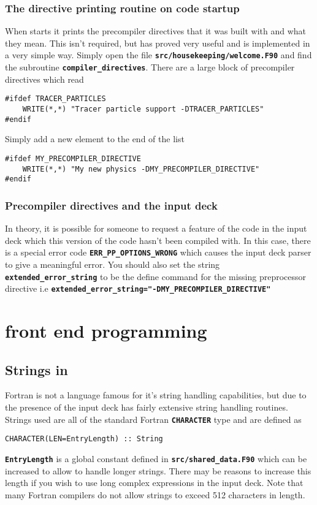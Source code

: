 \documentclass[12pt,a4paper]{article}
\newcommand{\simpleboxverbatim}{\begin{Verbatim}[obeytabs=true,frame=single,
  framerule=0.5mm,rulecolor=\color{warwickmid},formatcom=\color{black}]}
\newcommand{\inlinecode}[1]{{\color{warwickred} \bf\texttt{#1}}}
\newcommand{\EPOCH}{{\color{warwickdark}\fontfamily{phv}\selectfont{EPOCH}}}
\begin{document}
\subsubsection{The directive printing routine on code startup}
When {\EPOCH} starts it prints the precompiler directives that it was built with
and what they mean. This isn't required, but has proved very useful and is
implemented in a very simple way.  Simply open the file
\inlinecode{src/housekeeping/welcome.F90} and find the subroutine
\inlinecode{compiler\_directives}. There are a large block of precompiler
directives which read

\simpleboxverbatim
#ifdef TRACER_PARTICLES
    WRITE(*,*) "Tracer particle support -DTRACER_PARTICLES"
#endif
\end{Verbatim}

Simply add a new element to the end of the list
\simpleboxverbatim
#ifdef MY_PRECOMPILER_DIRECTIVE
    WRITE(*,*) "My new physics -DMY_PRECOMPILER_DIRECTIVE"
#endif
\end{Verbatim}

\subsubsection{Precompiler directives and the input deck}
In theory, it is possible for someone to request a feature of the code in the
input deck which this version of the code hasn't been compiled with. In this
case, there is a special error code \inlinecode{ERR\_PP\_OPTIONS\_WRONG} which
causes the input deck parser to give a meaningful error. You should also set
the string \inlinecode{extended\_error\_string} to be the define command for
the missing preprocessor directive i.e
\inlinecode{extended\_error\_string="-DMY\_PRECOMPILER\_DIRECTIVE"}

\section{{\EPOCH} front end programming}

\subsection{Strings in {\EPOCH}}
Fortran is not a language famous for it's string handling capabilities, but due
to the presence of the input deck {\EPOCH} has fairly extensive string handling
routines. Strings used are all of the standard Fortran \inlinecode{CHARACTER}
type and are defined as
\simpleboxverbatim
CHARACTER(LEN=EntryLength) :: String
\end{Verbatim}
\inlinecode{EntryLength} is a global constant defined in
\inlinecode{src/shared\_data.F90} which can be increased to allow {\EPOCH} to
handle longer strings. There may be reasons to increase this length if you wish
to use long complex expressions in the input deck. Note that many Fortran
compilers do not allow strings to exceed 512 characters in length.
\end{document}
